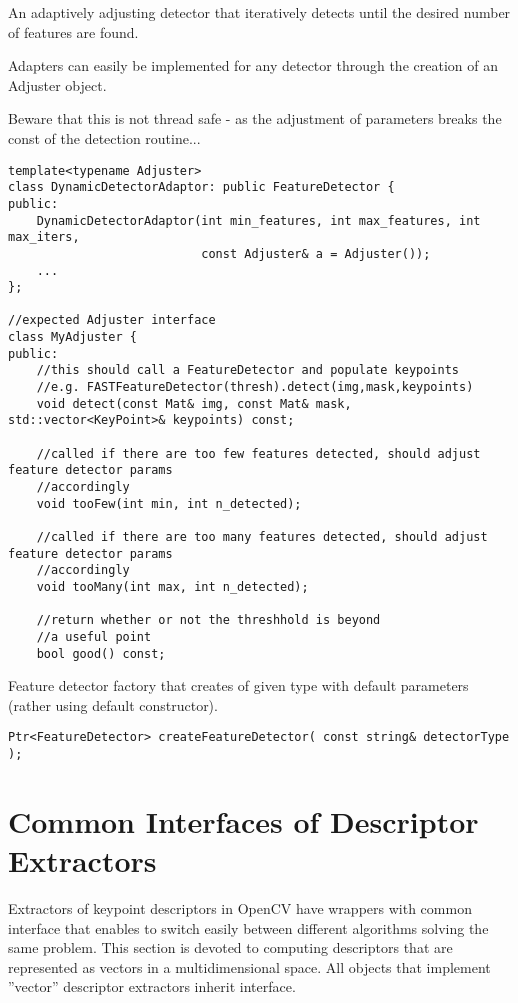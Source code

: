 An adaptively adjusting detector that iteratively detects until the desired number
of features are found.

Adapters can easily be implemented for any detector through the creation of an Adjuster
object.

Beware that this is not thread safe - as the adjustment of parameters breaks the const
of the detection routine...

\begin{lstlisting}
template<typename Adjuster>
class DynamicDetectorAdaptor: public FeatureDetector {
public:
	DynamicDetectorAdaptor(int min_features, int max_features, int max_iters, 
						   const Adjuster& a = Adjuster());
    ...
};

//expected Adjuster interface
class MyAdjuster {
public:
	//this should call a FeatureDetector and populate keypoints
	//e.g. FASTFeatureDetector(thresh).detect(img,mask,keypoints)
	void detect(const Mat& img, const Mat& mask, std::vector<KeyPoint>& keypoints) const;

	//called if there are too few features detected, should adjust feature detector params
	//accordingly
	void tooFew(int min, int n_detected);
	
	//called if there are too many features detected, should adjust feature detector params
	//accordingly
	void tooMany(int max, int n_detected);

	//return whether or not the threshhold is beyond
	//a useful point
	bool good() const;
\end{lstlisting}


Feature detector factory that creates  of given type with 
default parameters (rather using default constructor).

\begin{lstlisting}
Ptr<FeatureDetector> createFeatureDetector( const string& detectorType );
\end{lstlisting}

\begin{description}
\end{description}



\section{Common Interfaces of Descriptor Extractors}
Extractors of keypoint descriptors in OpenCV have wrappers with common interface that enables to switch easily 
between different algorithms solving the same problem. This section is devoted to computing descriptors 
that are represented as vectors in a multidimensional space. All objects that implement ''vector'' 
descriptor extractors inherit  interface.

